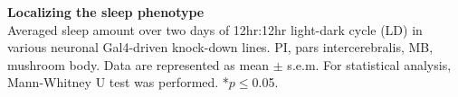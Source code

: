 \label{fig:S4}
\textbf{Localizing the sleep phenotype}
\\
Averaged sleep amount over two days of 12hr:12hr light-dark cycle (LD) in various neuronal Gal4-driven knock-down lines.
PI, pars intercerebralis, MB, mushroom body.
Data are represented as mean $\pm$ s.e.m.
For statistical analysis, Mann-Whitney U test was performed.
*$p\le$0.05.
  
